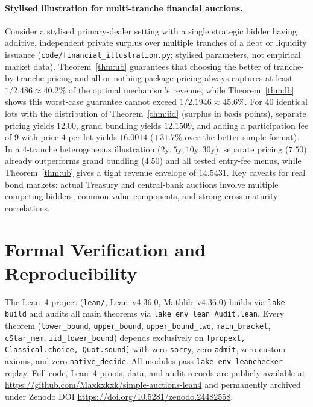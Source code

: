 \documentclass[11pt]{article}
\begin{document}
\paragraph{Stylised illustration for multi-tranche financial auctions.}
Consider a stylised primary-dealer setting with a single strategic bidder having additive, independent private surplus over multiple tranches of a debt or liquidity issuance (\texttt{code/financial\_illustration.py}; stylised parameters, not empirical market data). Theorem~\ref{thm:ub} guarantees that choosing the better of tranche-by-tranche pricing and all-or-nothing package pricing always captures at least $1/2.486 \approx 40.2\%$ of the optimal mechanism's revenue, while Theorem~\ref{thm:lb} shows this worst-case guarantee cannot exceed $1/2.1946 \approx 45.6\%$. For $40$ identical lots with the distribution of Theorem~\ref{thm:iid} (surplus in basis points), separate pricing yields $12.00$, grand bundling yields $12.1509$, and adding a participation fee of $9$ with price $4$ per lot yields $16.0014$ ($+31.7\%$ over the better simple format). In a $4$-tranche heterogeneous illustration ($2\text{y}, 5\text{y}, 10\text{y}, 30\text{y}$), separate pricing ($7.50$) already outperforms grand bundling ($4.50$) and all tested entry-fee menus, while Theorem~\ref{thm:ub} gives a tight revenue envelope of $14.5431$. Key caveats for real bond markets: actual Treasury and central-bank auctions involve multiple competing bidders, common-value components, and strong cross-maturity correlations.

\section{Formal Verification and Reproducibility}

The Lean~4 project (\texttt{lean/}, Lean~v4.36.0, Mathlib~v4.36.0) builds via \texttt{lake build} and audits all main theorems via \texttt{lake env lean Audit.lean}. Every theorem (\texttt{lower\_bound}, \texttt{upper\_bound}, \texttt{upper\_bound\_two}, \texttt{main\_bracket}, \texttt{cStar\_mem}, \texttt{iid\_lower\_bound}) depends exclusively on \texttt{[propext, Classical.choice, Quot.sound]} with zero \texttt{sorry}, zero \texttt{admit}, zero custom axioms, and zero \texttt{native\_decide}. All modules pass \texttt{lake env leanchecker} replay. Full code, Lean~4 proofs, data, and audit records are publicly available at \url{https://github.com/Maxkxkxk/simple-auctions-lean4} and permanently archived under Zenodo DOI \url{https://doi.org/10.5281/zenodo.24482558}.
\end{document}
